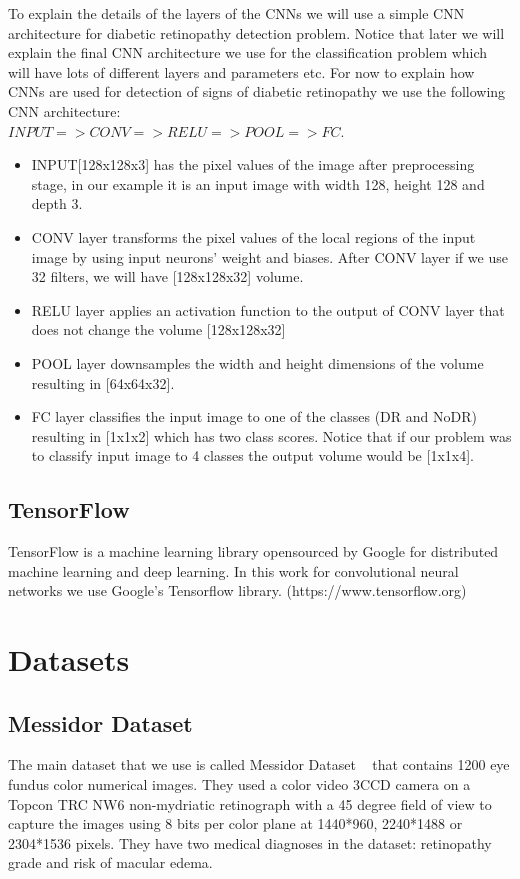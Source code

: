To explain the details of the layers of the CNNs we will use a simple CNN architecture for diabetic retinopathy detection problem. Notice that later we will explain the final CNN architecture we use for the classification problem which will have lots of different layers and parameters etc. For now to explain how CNNs are used for detection of signs of diabetic retinopathy we use the following CNN architecture:\\ 
${INPUT => CONV => RELU => POOL => FC}$. 

\begin{itemize}
    \item INPUT[128x128x3] has the pixel values of the image after preprocessing stage, in our example it is an input image with width 128, height 128 and depth 3.
    \item CONV layer transforms the pixel values of the local regions of the input image by using input neurons' weight and biases. After CONV layer if we use 32 filters, we will have [128x128x32] volume.
    \item RELU layer applies an activation function to the output of CONV layer that does not change the volume [128x128x32]
    \item POOL layer downsamples the width and height dimensions of the volume resulting in [64x64x32].
    \item FC layer classifies the input image to one of the classes (DR and NoDR) resulting in [1x1x2] which has two class scores. Notice that if our problem was to classify input image to 4 classes the output volume would be [1x1x4].
\end{itemize}


\subsection{TensorFlow}
TensorFlow is a machine learning library opensourced by Google for distributed machine learning and deep learning. In this work for convolutional neural networks we use Google's Tensorflow library. (https://www.tensorflow.org) 

\section{Datasets}
\subsection{Messidor Dataset}
The main dataset that we use is called Messidor Dataset ~\cite{decenciere2014feedback} that contains 1200 eye fundus color numerical images. They used a color video 3CCD camera on a Topcon TRC NW6 non-mydriatic retinograph with a 45 degree field of view to capture the images using 8 bits per color plane at 1440*960, 2240*1488 or 2304*1536 pixels. 
They have two medical diagnoses in the dataset: retinopathy grade and risk of macular edema. 

